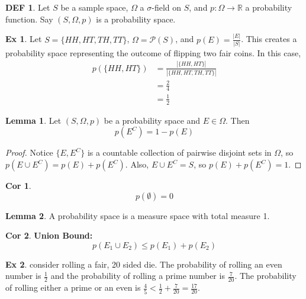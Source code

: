 \documentclass{article}
\theoremstyle{definition}\newtheorem{definition}{DEF}
\theoremstyle{definition}\newtheorem{example}{Ex}
\theoremstyle{lemma}\newtheorem{lemma}{Lemma}
\theoremstyle{corrolary}\newtheorem{corrolary}{Cor}
\begin{document}
\begin{definition}
Let $S$ be a sample space, $\Omega$ a $\sigma$-field on $S$, and $p: \Omega \rightarrow \mathbb{R}$ a probability function.
Say $(S, \Omega, p)$ is a probability space. 
\end{definition}

\begin{example}
Let $S = \{ HH, HT, TH, TT \}$, $\Omega = \mathcal{P}(S)$, and $p(E) = \frac{|E|}{|S|}$.
This creates a probability space representing the outcome of flipping two fair coins.
In this case, 
\begin{align}
p(\{HH, HT \}) &= \frac{|\{HH, HT \}|}{| \{ HH, HT, TH, TT \}|} \\
&= \frac{2}{4} \\
&=\frac{1}{2}
\end{align}
\end{example}

\begin{lemma}
Let $(S, \Omega, p)$ be a probability space and $E \in \Omega$.
Then 
\begin{equation}
p(E^C) = 1 - p(E)
\end{equation}
\end{lemma}
\begin{proof}
Notice $\{ E, E^C \}$ is a countable collection of pairwise disjoint sets in $\Omega$, so $p(E \cup E^C ) = p(E) + p(E^C )$.
Also, $E\cup E^C=S$, so $p(E) + p(E^C )= 1$.
\end{proof}
\begin{corrolary}
\begin{equation}
p(\emptyset ) = 0
\end{equation}
\end{corrolary}

\begin{lemma}
A probability space is a measure space with total measure 1.
\end{lemma}
\begin{corrolary}
\textbf{Union Bound: }\label{union}
\begin{equation}
p(E_1 \cup E_2) \leq p(E_1) + p(E_2)
\end{equation}
\end{corrolary}

\begin{example}
consider rolling a fair, 20 sided die.
The probability of rolling an even number is $\frac{1}{2}$ and the probability of rolling a prime number is $\frac{7}{20}$.
The probability of rolling either a prime or an even is $\frac{4}{5}<\frac{1}{2}+\frac{7}{20}=\frac{17}{20}$.
\end{example}
\end{document}

